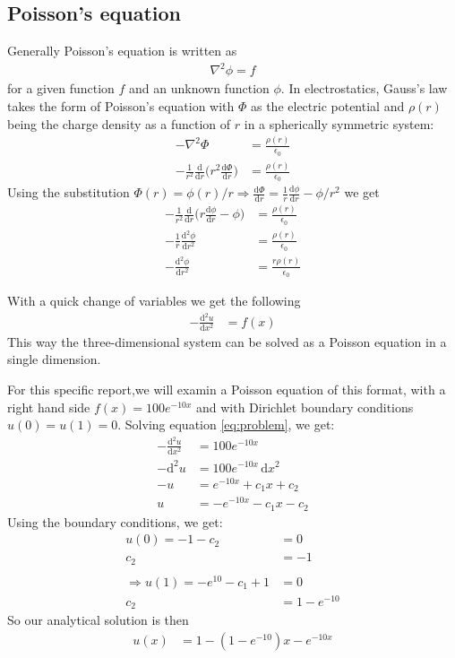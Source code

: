 \documentclass[english]{article}
\renewcommand{\d}{\mathrm{d}} %
\begin{document}
\subsection{Poisson's equation}
Generally Poisson's equation\autocite{Poisson} is written as
\begin{align*}
    \nabla^2 \phi = f
\end{align*}
for a given function $f$ and an unknown function $\phi$. In electrostatics, Gauss's law\autocite{Gauss} takes the form of Poisson's equation with $\Phi$ as the electric potential and $\rho(r)$ being the charge density as a function of $r$ in a spherically symmetric system:
\begin{align*}
    -\nabla^2 \Phi &= \frac{\rho(r)}{\epsilon_0} \\
    -\frac{1}{r^2} \frac{\d}{\d r}\Big( r^2\frac{\d \Phi}{\d r} \Big) &= \frac{\rho(r)}{\epsilon_0}
\end{align*}
Using the substitution $\Phi(r) = \phi(r)/r \Rightarrow \frac{\d \Phi}{\d r} = \frac{1}{r}\frac{\d \phi}{\d r} - \phi/r^2$ we get
\begin{align*}
    -\frac{1}{r^2} \frac{\d}{\d r}\Big( r\frac{\d \phi}{\d r} - \phi \Big) &= \frac{\rho(r)}{\epsilon_0} \nonumber \\
    -\frac{1}{r}\frac{\d^2 \phi}{\d r^2} &= \frac{\rho(r)}{\epsilon_0} \nonumber \\
    -\frac{\d^2 \phi}{\d r^2} &= \frac{r \rho(r)}{\epsilon_0}
\end{align*}

With a quick change of variables we get the following
\begin{align} \label{eq:problem}
    -\frac{\d^2 u}{\d x^2} &= f(x)
\end{align}
This way the three-dimensional system can be solved as a Poisson equation in a single dimension.

For this specific report,we will examin a Poisson equation of this format, with a right hand side $f(x) = 100e^{-10x}$ and with Dirichlet boundary conditions $u(0) = u(1) = 0$. Solving equation \eqref{eq:problem}, we get:
\begin{align*}
    -\frac{\d^2 u}{\d x^2} &= 100e^{-10x} \\
    -\d^2u &= 100e^{-10x} \,\d x^2 \\
   -u &= e^{-10x} + c_1x + c_2 \\
   u &= -e^{-10x} - c_1x - c_2
\end{align*}
Using the boundary conditions, we get:
\begin{align*}
    u(0) = -1 - c_2 &= 0 \\
    c_2 &= -1 \\
    \\
    \Rightarrow u(1) = -e^{10} - c_1 + 1 &= 0 \\
    c_2 &= 1 - e^{-10}
\end{align*}
So our analytical solution is then
\begin{align} \label{eq:analytical_solution}
    u(x) &= 1 - (1-e^{-10})x - e^{-10x}
\end{align}
\end{document}
